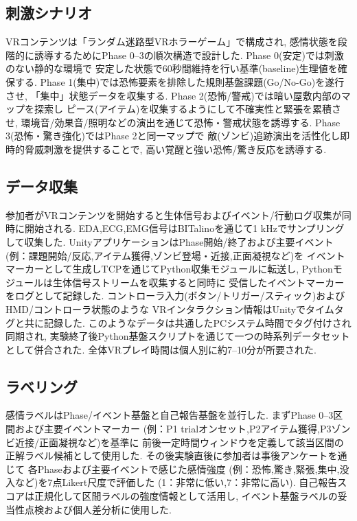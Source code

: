 \documentclass[book,paper=a4,fontsize=10pt,jafontscale=0.92]{jlreq}
\begin{document}
\subsection{刺激シナリオ}

VRコンテンツは「ランダム迷路型VRホラーゲーム」で構成され,
感情状態を段階的に誘導するためにPhase 0--3の順次構造で設計した.
Phase 0(安定)では刺激のない静的な環境で
安定した状態で60秒間維持を行い基準(baseline)生理値を確保する.
Phase 1(集中)では恐怖要素を排除した規則基盤課題(Go/No-Go)を遂行させ,
「集中」状態データを収集する.
Phase 2(恐怖/警戒)では暗い屋敷内部のマップを探索し
ピース(アイテム)を収集するようにして不確実性と緊張を累積させ,
環境音/効果音/照明などの演出を通じて恐怖・警戒状態を誘導する.
Phase 3(恐怖・驚き強化)ではPhase 2と同一マップで
敵(ゾンビ)追跡演出を活性化し即時的脅威刺激を提供することで,
高い覚醒と強い恐怖/驚き反応を誘導する.

\subsection{データ収集}

参加者がVRコンテンツを開始すると生体信号およびイベント/行動ログ収集が同時に開始される.
EDA,ECG,EMG信号はBITalinoを通じて1 kHzでサンプリングして収集した.
UnityアプリケーションはPhase開始/終了および主要イベント
(例：課題開始/反応,アイテム獲得,ゾンビ登場・近接,正面凝視など)を
イベントマーカーとして生成しTCPを通じてPython収集モジュールに転送し,
Pythonモジュールは生体信号ストリームを収集すると同時に
受信したイベントマーカーをログとして記録した.
コントローラ入力(ボタン/トリガー/スティック)およびHMD/コントローラ状態のような
VRインタラクション情報はUnityでタイムタグと共に記録した.
このようなデータは共通したPCシステム時間でタグ付けされ同期され,
実験終了後Python基盤スクリプトを通じて一つの時系列データセットとして併合された.
全体VRプレイ時間は個人別に約7--10分が所要された.

\subsection{ラベリング}

感情ラベルはPhase/イベント基盤と自己報告基盤を並行した.
まずPhase 0--3区間および主要イベントマーカー
(例：P1 trialオンセット,P2アイテム獲得,P3ゾンビ近接/正面凝視など)を基準に
前後一定時間ウィンドウを定義して該当区間の正解ラベル候補として使用した.
その後実験直後に参加者は事後アンケートを通じて
各Phaseおよび主要イベントで感じた感情強度
(例：恐怖,驚き,緊張,集中,没入など)を7点Likert尺度で評価した
(1：非常に低い,7：非常に高い).
自己報告スコアは正規化して区間ラベルの強度情報として活用し,
イベント基盤ラベルの妥当性点検および個人差分析に使用した.
\end{document}
